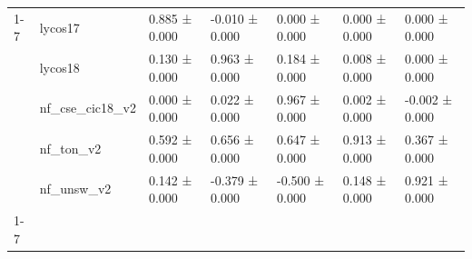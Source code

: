 \begin{table}
\begin{tabular}{lllllll}
\cline{1-7}
\multirow[t]{5}{*}{xgb} & lycos17 & 0.885 ± 0.000 & -0.010 ± 0.000 & 0.000 ± 0.000 & 0.000 ± 0.000 & 0.000 ± 0.000 \\
 & lycos18 & 0.130 ± 0.000 & 0.963 ± 0.000 & 0.184 ± 0.000 & 0.008 ± 0.000 & 0.000 ± 0.000 \\
 & nf_cse_cic18_v2 & 0.000 ± 0.000 & 0.022 ± 0.000 & 0.967 ± 0.000 & 0.002 ± 0.000 & -0.002 ± 0.000 \\
 & nf_ton_v2 & 0.592 ± 0.000 & 0.656 ± 0.000 & 0.647 ± 0.000 & 0.913 ± 0.000 & 0.367 ± 0.000 \\
 & nf_unsw_v2 & 0.142 ± 0.000 & -0.379 ± 0.000 & -0.500 ± 0.000 & 0.148 ± 0.000 & 0.921 ± 0.000 \\
\cline{1-7}
\bottomrule
\end{tabular}
\end{table}
